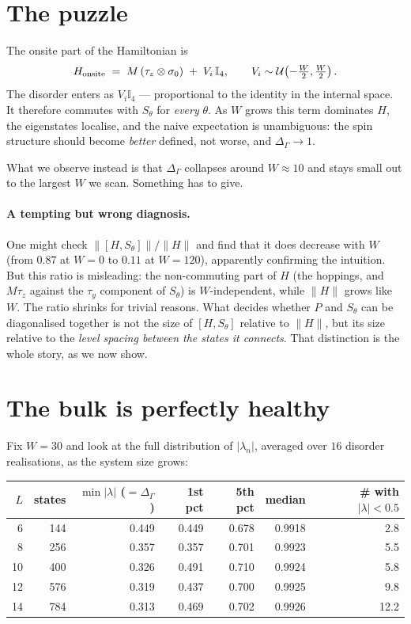 \documentclass[11pt,a4paper]{article}
\newcommand{\Sth}{S_\theta}
\begin{document}
\section{The puzzle}

The onsite part of the Hamiltonian is
\begin{equation}
  H_{\rm onsite} \;=\; M\,(\tau_z\otimes\sigma_0) \;+\; V_i\,\mathbb{I}_4 ,
  \qquad V_i \sim \mathcal{U}\!\left(-\tfrac{W}{2},\tfrac{W}{2}\right).
\end{equation}
The disorder enters as $V_i \mathbb{I}_4$ --- proportional to the identity in
the internal space. It therefore commutes with $\Sth$ for \emph{every}
$\theta$. As $W$ grows this term dominates $H$, the eigenstates localise, and
the naive expectation is unambiguous: the spin structure should become
\emph{better} defined, not worse, and $\Delta_\Gamma \to 1$.

What we observe instead is that $\Delta_\Gamma$ collapses around $W\approx10$
and stays small out to the largest $W$ we scan. Something has to give.

\paragraph{A tempting but wrong diagnosis.} One might check
$\lVert[H,\Sth]\rVert / \lVert H\rVert$ and find that it does decrease with
$W$ (from $0.87$ at $W=0$ to $0.11$ at $W=120$), apparently confirming the
intuition. But this ratio is misleading: the non-commuting part of $H$ (the
hoppings, and $M\tau_z$ against the $\tau_y$ component of $\Sth$) is
$W$-independent, while $\lVert H\rVert$ grows like $W$. The ratio shrinks for
trivial reasons. What decides whether $P$ and $\Sth$ can be diagonalised
together is not the size of $[H,\Sth]$ relative to $\lVert H\rVert$, but its
size relative to the \emph{level spacing between the states it connects}.
That distinction is the whole story, as we now show.

\section{The bulk is perfectly healthy}

Fix $W=30$ and look at the full distribution of $|\lambda_n|$, averaged over
$16$ disorder realisations, as the system size grows:

\begin{center}
\begin{tabular}{@{}rrrrrrr@{}}
\toprule
$L$ & states & $\min|\lambda|$ ($=\Delta_\Gamma$) & 1st pct & 5th pct & median & \# with $|\lambda|<0.5$ \\
\midrule
 6 & 144 & 0.449 & 0.449 & 0.678 & 0.9918 &  2.8 \\
 8 & 256 & 0.357 & 0.357 & 0.701 & 0.9923 &  5.5 \\
10 & 400 & 0.326 & 0.491 & 0.710 & 0.9924 &  5.8 \\
12 & 576 & 0.319 & 0.437 & 0.700 & 0.9925 &  9.8 \\
14 & 784 & 0.313 & 0.469 & 0.702 & 0.9926 & 12.2 \\
\bottomrule
\end{tabular}
\end{center}
\end{document}
